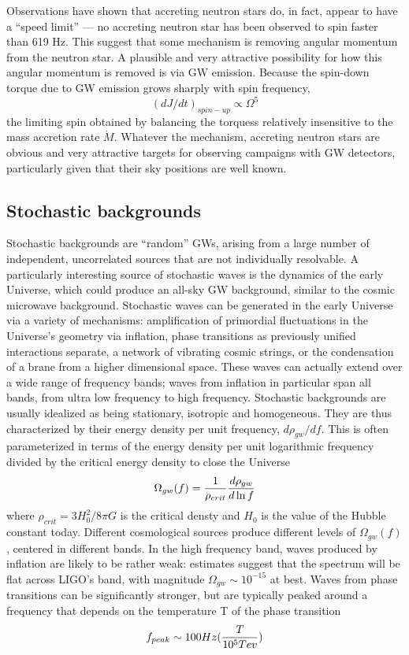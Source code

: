 \documentclass[binding=0.6cm, LaM]{sapthesis}
\begin{document}
Observations have shown that accreting neutron stars do, in fact, appear to have a “speed limit” — no accreting neutron star has been observed to spin faster than 619 Hz. 
This suggest that some mechanism is removing angular momentum from the neutron star. 
A plausible and very attractive possibility for how this angular momentum is removed is via GW emission. Because the spin-down torque
due to GW emission grows sharply with spin frequency,
\begin{equation}
(dJ/dt)_{spin-up} \propto \Omega^5 
\end{equation}
the limiting spin obtained by balancing the torquess relatively insensitive to the mass accretion rate $\dot M$. 
Whatever the mechanism, accreting neutron stars are obvious and very attractive targets for observing campaigns with GW detectors, particularly given that their sky positions are well known.
\subsection{Stochastic backgrounds}
Stochastic backgrounds are “random” GWs, arising from a large number of independent, uncorrelated sources that are not individually resolvable. 
A particularly interesting source of stochastic waves is the dynamics of the early Universe, which could produce an all-sky GW background, similar to the cosmic microwave background. 
Stochastic waves can be generated in the early Universe via a variety of mechanisms: amplification of primordial fluctuations in the Universe’s geometry via inflation, phase transitions as previously 
unified interactions separate, a network of vibrating cosmic strings, or the condensation of a brane from a higher dimensional space. 
These waves can actually extend over a wide range of frequency bands; waves from inflation in particular span all bands, from ultra low frequency to high frequency.
 Stochastic backgrounds are usually idealized as being stationary, isotropic and homogeneous. They are thus characterized by their energy density per unit frequency, $d\rho_{gw}/df$. 
This is often parameterized in terms of the energy density per unit logarithmic frequency divided by the critical energy density to close the Universe
\begin{equation}
\Omega_{gw}(f) = {1 \over {\rho_{crit}}}{{d\rho_{gw}}\over{d\ln{f}}}
\end{equation}
where $\rho_{crit} = 3H_0^2/8\pi G$ is the critical densty and $H_0$ is the value of the Hubble constant today.
 Different cosmological sources produce different levels of $\Omega_{gw}(f)$, centered in different bands. 
In the high frequency band, waves produced by inflation are likely to be rather weak: estimates suggest that the spectrum will be flat across LIGO’s band, 
with magnitude $\Omega_{gw} \sim 10^{-15}$ at best. 
Waves from phase transitions can be significantly stronger, but are typically peaked around a frequency that depends on the temperature T of the phase transition
\begin{equation}
f_{peak} \sim 100Hz({T \over {10^5 Tev}})
\end{equation}
\end{document}
